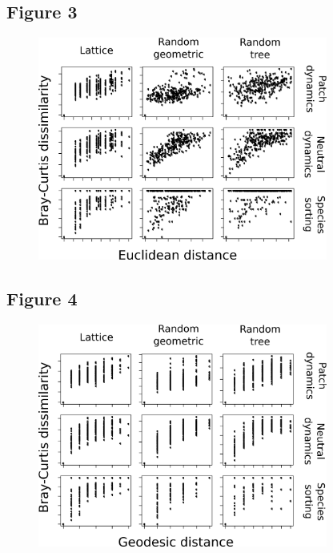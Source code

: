 \documentclass[12pt]{article}
\begin{document}
\newpage

\subsection*{Figure 3}

\begin{figure}[ht!]
	\centering\includegraphics[width=0.85\textwidth]{BetaGeoDist.png}
\end{figure}

\newpage

\subsection*{Figure 4}

\begin{figure}[ht!]
	\centering\includegraphics[width=0.85\textwidth]{BetaTopoDist.png}
\end{figure}
\end{document}

